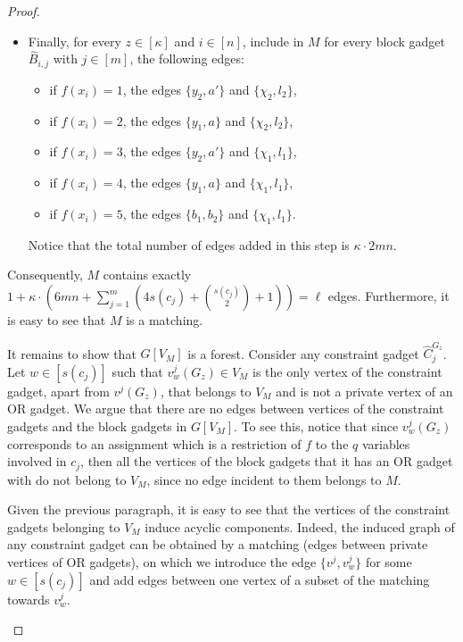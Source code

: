 \begin{proof}
\begin{nestedproof}
\begin{itemize}
                \item Finally, for every $z \in [\kappa]$ and $i \in [n]$, include in $M$ for every block gadget $\hat{B}_{i,j}$ with $j \in [m]$,
                the following edges:
                \begin{itemize}
                    \item if $f(x_i) = 1$, the edges $\{ y_2, a' \}$ and $\{ \chi_2, l_2 \}$,

                    \item if $f(x_i) = 2$, the edges $\{ y_1, a \}$ and $\{ \chi_2, l_2 \}$,

                    \item if $f(x_i) = 3$, the edges $\{ y_2, a' \}$ and $\{ \chi_1, l_1 \}$,

                    \item if $f(x_i) = 4$, the edges $\{ y_1, a \}$ and $\{ \chi_1, l_1 \}$,

                    \item if $f(x_i) = 5$, the edges $\{ b_1, b_2 \}$ and $\{ \chi_1, l_1 \}$.
                \end{itemize}
                Notice that the total number of edges added in this step is
                $\kappa \cdot 2mn$.
            \end{itemize}
            Consequently, $M$ contains exactly
            $1 + \kappa \cdot \left(6m n + \sum_{j=1}^m \left(4s(c_j) + \binom{s(c_j)}{2} + 1 \right)\right) = \ell$ edges.
            Furthermore, it is easy to see that $M$ is a matching.

            It remains to show that $G[V_M]$ is a forest.
            Consider any constraint gadget $\hat{C}^{G_z}_j$.
            Let $w \in [s(c_j)]$ such that $v^j_w (G_z) \in V_M$ is the only vertex of the constraint gadget,
            apart from $v^j (G_z)$, that belongs to $V_M$ and is not a private vertex of an OR gadget.
            We argue that there are no edges between vertices of the constraint gadgets and the block gadgets in $G[V_M]$.
            To see this, notice that since $v^j_w (G_z)$ corresponds to an assignment which is a restriction of $f$
            to the $q$ variables involved in $c_j$, then all the vertices of the block gadgets that it has an OR gadget with
            do not belong to $V_M$, since no edge incident to them belongs to $M$.

            Given the previous paragraph, it is easy to see that the vertices of the constraint gadgets belonging to $V_M$ induce acyclic components.
            Indeed, the induced graph of any constraint gadget can be obtained by a matching (edges between private vertices of OR gadgets),
            on which we introduce the edge $\{v^j,v^j_w\}$ for some $w \in [s(c_j)]$ and add edges between one vertex of a subset of the matching towards $v^j_w$.


\end{nestedproof}
\end{proof}
